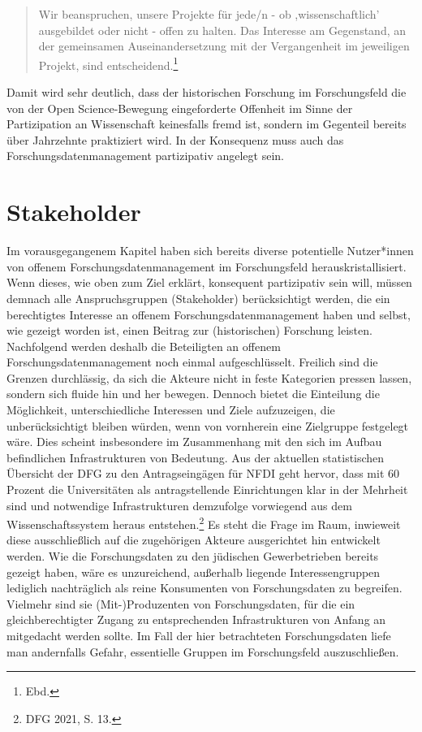 \begin{quote}
    Wir beanspruchen, unsere Projekte für jede/n - ob ,wissenschaftlich' ausgebildet oder nicht - offen zu halten. Das Interesse am Gegenstand, an der gemeinsamen Auseinandersetzung mit der Vergangenheit im jeweiligen Projekt, sind entscheidend.\footnote{Ebd.}
\end{quote}

Damit wird sehr deutlich, dass der historischen Forschung im Forschungsfeld die von der Open Science-Bewegung eingeforderte Offenheit im Sinne der Partizipation an Wissenschaft keinesfalls fremd ist, sondern im Gegenteil bereits über Jahrzehnte praktiziert wird. In der Konsequenz muss auch das Forschungsdatenmanagement partizipativ angelegt sein.

\section{Stakeholder}
 
Im vorausgegangenem Kapitel haben sich bereits diverse potentielle Nutzer*innen von offenem Forschungsdatenmanagement im Forschungsfeld herauskristallisiert. Wenn dieses, wie oben zum Ziel erklärt, konsequent partizipativ sein will, müssen demnach alle Anspruchsgruppen (Stakeholder) berücksichtigt werden, die ein berechtigtes Interesse an offenem Forschungsdatenmanagement haben und selbst, wie gezeigt worden ist, einen Beitrag zur (historischen) Forschung leisten. Nachfolgend werden deshalb die Beteiligten an offenem Forschungsdatenmanagement noch einmal aufgeschlüsselt. Freilich sind die Grenzen durchlässig, da sich die Akteure nicht in feste Kategorien pressen lassen, sondern sich fluide hin und her bewegen. Dennoch bietet die Einteilung die Möglichkeit, unterschiedliche Interessen und Ziele aufzuzeigen, die unberücksichtigt bleiben würden, wenn von vornherein eine Zielgruppe festgelegt wäre. Dies scheint insbesondere im Zusammenhang mit den sich im Aufbau befindlichen Infrastrukturen von Bedeutung. Aus der aktuellen statistischen Übersicht der DFG zu den Antragseingägen für NFDI geht hervor, dass mit 60 Prozent die Universitäten als antragstellende Einrichtungen klar in der Mehrheit sind und notwendige Infrastrukturen demzufolge vorwiegend aus dem Wissenschaftssystem heraus entstehen.\footnote{DFG 2021, S. 13.} Es steht die Frage im Raum, inwieweit diese ausschließlich auf die zugehörigen Akteure ausgerichtet hin entwickelt werden. Wie die Forschungsdaten zu den jüdischen Gewerbetrieben bereits gezeigt haben, wäre es unzureichend, außerhalb liegende Interessengruppen lediglich nachträglich als reine Konsumenten von Forschungsdaten zu begreifen. Vielmehr sind sie (Mit-)Produzenten von Forschungsdaten, für die ein gleichberechtigter Zugang zu entsprechenden Infrastrukturen von Anfang an mitgedacht werden sollte. Im Fall der hier betrachteten Forschungsdaten liefe man andernfalls Gefahr, essentielle Gruppen im Forschungsfeld auszuschließen.

